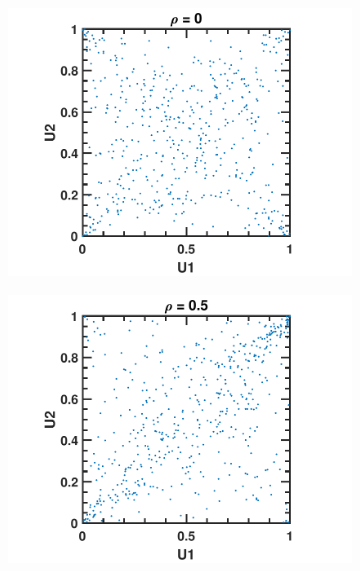 \begin{refsection}
\begin{figure}[H]
	\centering
	\begin{subfigure}[b]{0.42\textwidth}
		\includegraphics[width=\textwidth]{figures/statisticalModeling/StudentTCopulaDemo1}
	\end{subfigure}\quad
	\begin{subfigure}[b]{0.42\textwidth}
		\includegraphics[width=\textwidth]{figures/statisticalModeling/StudentTCopulaDemo2}
	\end{subfigure}\quad
	\begin{subfigure}[b]{0.42\textwidth}

\end{subfigure}
\end{figure}
\end{refsection}
